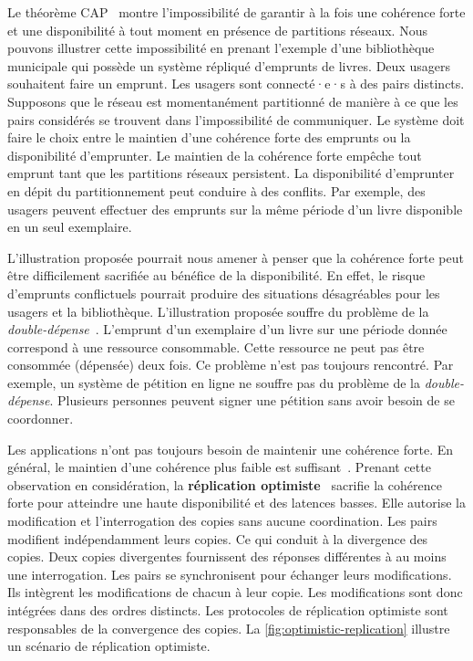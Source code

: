 Le théorème CAP~\cite{brewer_cap_2000,gilbert_cap_2002} montre l'impossibilité de garantir à la fois une cohérence forte et une disponibilité à tout moment en présence de partitions réseaux.
Nous pouvons illustrer cette impossibilité en prenant l'exemple d'une bibliothèque municipale qui possède un système répliqué d'emprunts de livres.
Deux usagers souhaitent faire un emprunt.
Les usagers sont connecté·e·s à des pairs distincts.
Supposons que le réseau est momentanément partitionné de manière à ce que les pairs considérés se trouvent dans l'impossibilité de communiquer.
Le système doit faire le choix entre le maintien d'une cohérence forte des emprunts ou la disponibilité d'emprunter.
Le maintien de la cohérence forte empêche tout emprunt tant que les partitions réseaux persistent.
La disponibilité d'emprunter en dépit du partitionnement peut conduire à des conflits.
Par exemple, des usagers peuvent effectuer des emprunts sur la même période d'un livre disponible en un seul exemplaire.

L'illustration proposée pourrait nous amener à penser que la cohérence forte peut être difficilement sacrifiée au bénéfice de la disponibilité.
En effet, le risque d'emprunts conflictuels pourrait produire des situations désagréables pour les usagers et la bibliothèque.
L'illustration proposée souffre du problème de la \emph{double-dépense}~\cite{chohan_doublespending_2017}.
L'emprunt d'un exemplaire d'un livre sur une période donnée correspond à une ressource consommable.
Cette ressource ne peut pas être consommée (dépensée) deux fois.
Ce problème n'est pas toujours rencontré.
Par exemple, un système de pétition en ligne ne souffre pas du problème de la \emph{double-dépense}.
Plusieurs personnes peuvent signer une pétition sans avoir besoin de se coordonner.

Les applications n'ont pas toujours besoin de maintenir une cohérence forte.
En général, le maintien d'une cohérence plus faible est suffisant~\autocite{terry_baseball_2013, hellerstein_calm_2019, decandia_dynamo_2007}.
Prenant cette observation en considération, la \textbf{réplication optimiste}~\autocite{saito_2005_optimisticreplication} sacrifie la cohérence forte pour atteindre une haute disponibilité et des latences basses.
Elle autorise la modification et l'interrogation des copies sans aucune coordination.
Les pairs modifient indépendamment leurs copies.
Ce qui conduit à la divergence des copies.
Deux copies divergentes fournissent des réponses différentes à au moins une interrogation.
Les pairs se synchronisent pour échanger leurs modifications.
Ils intègrent les modifications de chacun à leur copie.
Les modifications sont donc intégrées dans des ordres distincts.
Les protocoles de réplication optimiste sont responsables de la convergence des copies.
La \autoref{fig:optimistic-replication} illustre un scénario de réplication optimiste.

